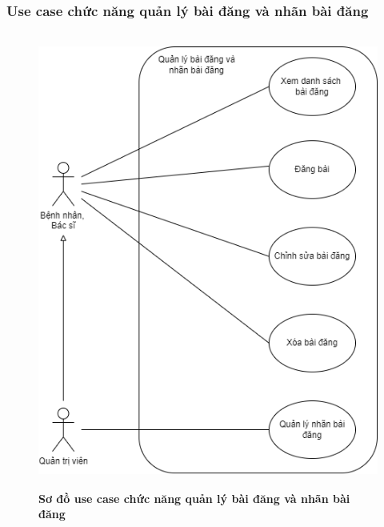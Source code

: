 \subsubsection{Use case chức năng quản lý bài đăng và nhãn bài đăng}
  \begin{figure}[H]
    \centering
    \includegraphics[width=12cm,height=15cm]{Images/use_case/use_case_manage_news.png}
    \caption[Sơ đồ use case chức năng quản lý bài đăng và nhãn bài đăng]{\bfseries \fontsize{12pt}{0pt}
    \selectfont Sơ đồ use case chức năng quản lý bài đăng và nhãn bài đăng}
    \label{use_case_news_management} %
  \end{figure}


